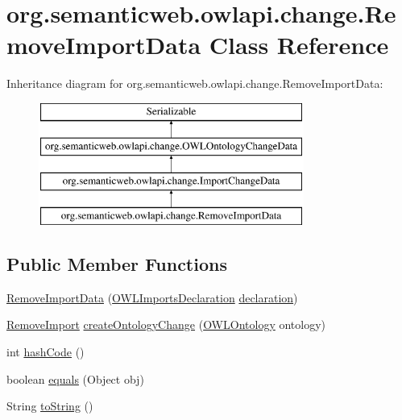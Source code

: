 \hypertarget{classorg_1_1semanticweb_1_1owlapi_1_1change_1_1_remove_import_data}{\section{org.\-semanticweb.\-owlapi.\-change.\-Remove\-Import\-Data Class Reference}
\label{classorg_1_1semanticweb_1_1owlapi_1_1change_1_1_remove_import_data}
}
Inheritance diagram for org.\-semanticweb.\-owlapi.\-change.\-Remove\-Import\-Data\-:\begin{figure}[H]
\begin{center}
\leavevmode
\includegraphics[height=4.000000cm]{classorg_1_1semanticweb_1_1owlapi_1_1change_1_1_remove_import_data}
\end{center}
\end{figure}
\subsection*{Public Member Functions}
\begin{DoxyCompactItemize}
\item 
\hyperlink{classorg_1_1semanticweb_1_1owlapi_1_1change_1_1_remove_import_data_a81e783bf12972dde94c08f7165e1e373}{Remove\-Import\-Data} (\hyperlink{interfaceorg_1_1semanticweb_1_1owlapi_1_1model_1_1_o_w_l_imports_declaration}{O\-W\-L\-Imports\-Declaration} \hyperlink{classorg_1_1semanticweb_1_1owlapi_1_1change_1_1_import_change_data_a23afda3aff2c6ee273efff9db5bb5315}{declaration})
\item 
\hyperlink{classorg_1_1semanticweb_1_1owlapi_1_1model_1_1_remove_import}{Remove\-Import} \hyperlink{classorg_1_1semanticweb_1_1owlapi_1_1change_1_1_remove_import_data_a571e3b60f3978bb2bb93824eecce6b5f}{create\-Ontology\-Change} (\hyperlink{interfaceorg_1_1semanticweb_1_1owlapi_1_1model_1_1_o_w_l_ontology}{O\-W\-L\-Ontology} ontology)
\item 
int \hyperlink{classorg_1_1semanticweb_1_1owlapi_1_1change_1_1_remove_import_data_a1fa21c67ea6a439fb2e8005f83c19030}{hash\-Code} ()
\item 
boolean \hyperlink{classorg_1_1semanticweb_1_1owlapi_1_1change_1_1_remove_import_data_a77a89345dabedfab9510add918677f13}{equals} (Object obj)
\item 
String \hyperlink{classorg_1_1semanticweb_1_1owlapi_1_1change_1_1_remove_import_data_a3087e1ce98b8c29452560dd025577b80}{to\-String} ()
\end{DoxyCompactItemize}
